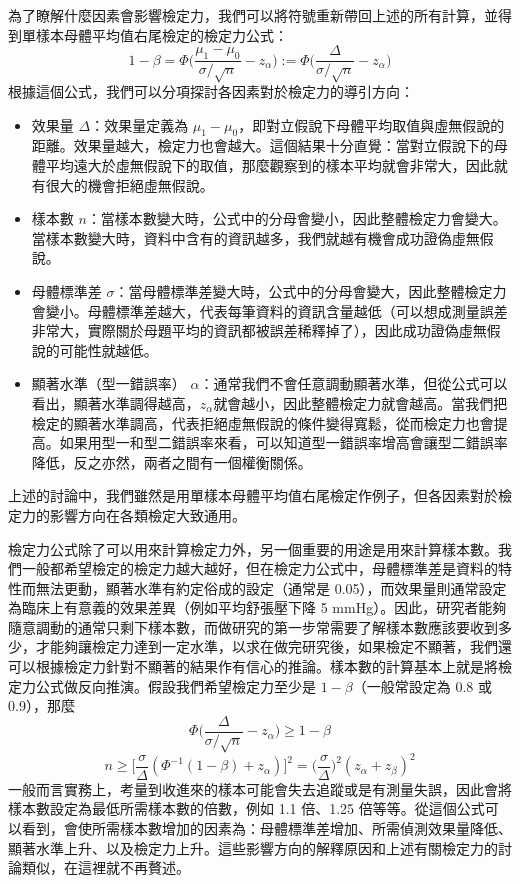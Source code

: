     為了瞭解什麼因素會影響檢定力，我們可以將符號重新帶回上述的所有計算，並得到單樣本母體平均值右尾檢定的檢定力公式：
    \[1-\beta = \Phi\Big(\frac{\mu_1-\mu_0}{\sigma/\sqrt{n}}-z_\alpha\Big) := \Phi\Big(\frac{\Delta}{\sigma/\sqrt{n}}-z_\alpha\Big)\]
    根據這個公式，我們可以分項探討各因素對於檢定力的導引方向：
    \begin{itemize}
        \item 效果量 $\Delta$：效果量定義為 $\mu_1-\mu_0$，即對立假說下母體平均取值與虛無假說的距離。效果量越大，檢定力也會越大。這個結果十分直覺：當對立假說下的母體平均遠大於虛無假說下的取值，那麼觀察到的樣本平均就會非常大，因此就有很大的機會拒絕虛無假說。
        \item 樣本數 $n$：當樣本數變大時，公式中的分母會變小，因此整體檢定力會變大。當樣本數變大時，資料中含有的資訊越多，我們就越有機會成功證偽虛無假說。
        \item 母體標準差 $\sigma$：當母體標準差變大時，公式中的分母會變大，因此整體檢定力會變小。母體標準差越大，代表每筆資料的資訊含量越低（可以想成測量誤差非常大，實際關於母題平均的資訊都被誤差稀釋掉了），因此成功證偽虛無假說的可能性就越低。
        \item 顯著水準（型一錯誤率） $\alpha$：通常我們不會任意調動顯著水準，但從公式可以看出，顯著水準調得越高，$z_\alpha$就會越小，因此整體檢定力就會越高。當我們把檢定的顯著水準調高，代表拒絕虛無假說的條件變得寬鬆，從而檢定力也會提高。如果用型一和型二錯誤率來看，可以知道型一錯誤率增高會讓型二錯誤率降低，反之亦然，兩者之間有一個權衡關係。
    \end{itemize}
    上述的討論中，我們雖然是用單樣本母體平均值右尾檢定作例子，但各因素對於檢定力的影響方向在各類檢定大致通用。

    檢定力公式除了可以用來計算檢定力外，另一個重要的用途是用來計算樣本數。我們一般都希望檢定的檢定力越大越好，但在檢定力公式中，母體標準差是資料的特性而無法更動，顯著水準有約定俗成的設定（通常是 0.05），而效果量則通常設定為臨床上有意義的效果差異（例如平均舒張壓下降 5 mmHg）。因此，研究者能夠隨意調動的通常只剩下樣本數，而做研究的第一步常需要了解樣本數應該要收到多少，才能夠讓檢定力達到一定水準，以求在做完研究後，如果檢定不顯著，我們還可以根據檢定力針對不顯著的結果作有信心的推論。樣本數的計算基本上就是將檢定力公式做反向推演。假設我們希望檢定力至少是 $1-\beta$（一般常設定為 0.8 或 0.9），那麼
    \[\Phi\Big(\frac{\Delta}{\sigma/\sqrt{n}}-z_\alpha\Big) \ge 1-\beta\]
    \[n \ge \Big[\frac{\sigma}{\Delta} (\Phi^{-1}(1-\beta) + z_\alpha)\Big]^2 = \Big(\frac{\sigma}{\Delta}\Big)^2(z_\alpha + z_\beta)^2\]
    一般而言實務上，考量到收進來的樣本可能會失去追蹤或是有測量失誤，因此會將樣本數設定為最低所需樣本數的倍數，例如 1.1 倍、1.25 倍等等。從這個公式可以看到，會使所需樣本數增加的因素為：母體標準差增加、所需偵測效果量降低、顯著水準上升、以及檢定力上升。這些影響方向的解釋原因和上述有關檢定力的討論類似，在這裡就不再贅述。
    
